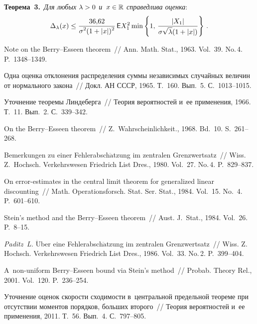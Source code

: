 \begin{multicols}{2}
\smallskip

\noindent
\textbf{Теорема~3.}\ \textit{Для любых $\lambda\hm>0$ и~$x\hm\in\mathbb{R}$
справедлива оценка}:
$$
\Delta_{\lambda}(x)\le \displaystyle\frac{\displaystyle 36{,}62\mathstrut}{\displaystyle \sigma^2(1+|x|)^2\mathstrut}\, {\sf E}
X_1^2\min\left\{1,\,\displaystyle\frac{\displaystyle |X_1|\mathstrut}{\displaystyle \sigma\sqrt{\lambda}(1+|x|)\mathstrut}\right\}\,.
$$

{\small\frenchspacing
 {%
 \begin{thebibliography}{99}

 Note on the Berry--Esseen theorem~// Ann. Math.
Stat., 1963. Vol.~39. No.\,4. P.~1348--1349.

 Одна оценка отклонения распределения суммы
независимых случайных величин от нормального закона~// Докл. АН
СССР, 1965. Т.~160. Вып.~5. С.~1013--1015.

 Уточнение теоремы Линдеберга~// Теория
вероятностей и~ее применения, 1966. Т.~11. Вып.~2. С.~339--342.

 On the Berry--Esseen theorem~// Z.~Wahrscheinlichkeit., 1968. Bd.~10. S.~261--268.

 Bemerkungen zu einer Fehlerabsch$\ddot{\mbox{a}}$tzung im
zentralen Grenzwertsatz~// Wiss. Z.~Hochsch. Verkehrswesen
Friedrich List Dres., 1980. Vol.~27. No.\,4. P.~829--837.

 On error-estimates in the central limit theorem for
generalized linear discounting~// Math. Operationsforsch. Stat. 
Ser. Stat., 1984. Vol.~15. No.~4. P.~601--610.

 Stein's method and the Berry--Esseen
theorem~// Aust. J.~Stat., 1984. Vol.~26.
P.~8--15.

{\it Paditz~L.} $\ddot{\mbox{U}}$ber eine Fehlerabsch$\ddot{\mbox{a}}$tzung im zentralen
Grenzwertsatz~// Wiss. Z. Hochsch. Verkehrswesen
Friedrich List Dres., 1986. Vol.~33. No.\,2. P.~399--404.



 A~non-uniform Berry--Esseen bound
via Stein's method~// Probab. Theory Rel., 2001.
Vol.~120. P.~236--254.

 Уточнение оценок ско\-рости
сходимости в~центральной предельной теореме при отсутствии моментов
порядков, больших второго~// Тео\-рия вероятностей и~ее применения,
2011. Т.~56. Вып.~4. С.~797--805.


\end{thebibliography}}}
\end{multicols}
